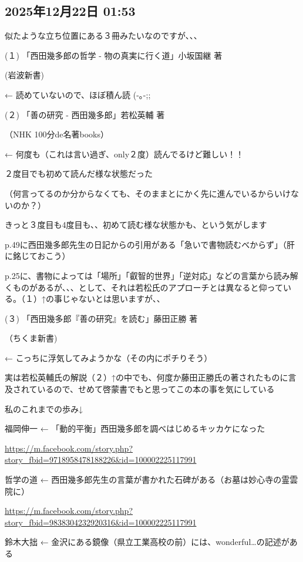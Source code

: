 \documentclass[facebook_diary.tex]{subfiles}
\begin{document}
\subsection*{2025年12月22日 01:53}

似たような立ち位置にある３冊みたいなのですが、、、


(１) 「西田幾多郎の哲学 - 物の真実に行く道」小坂国継 著

(岩波新書)

← 読めていないので、ほぼ積ん読 (-｡-;;


(２) 「善の研究 - 西田幾多郎」若松英輔 著

（NHK 100分de名著books）

← 何度も（これは言い過ぎ、only２度）読んでるけど難しい！！

２度目でも初めて読んだ様な状態だった

（何言ってるのか分からなくても、そのままとにかく先に進んでいるからいけないのか？）

きっと３度目も4度目も、、初めて読む様な状態かも、という気がします

p.49に西田幾多郎先生の日記からの引用がある「急いで書物読むべからず」（肝に銘じておこう）

p.25に、書物によっては「場所」「叡智的世界」「逆対応」などの言葉から読み解くものがあるが、、、として、それは若松氏のアプローチとは異なると仰っている。（１）↑の事じゃないとは思いますが、、


(３) 「西田幾多郎『善の研究』を読む」藤田正勝 著

（ちくま新書)

← こっちに浮気してみようかな（その内にポチりそう）

実は若松英輔氏の解説（２）↑の中でも、何度か藤田正勝氏の著されたものに言及されているので、せめて啓蒙書でもと思ってこの本の事を気にしている


私のこれまでの歩み↓


福岡伸一 ← 「動的平衡」西田幾多郎を調べはじめるキッカケになった

\url{https://m.facebook.com/story.php?story_fbid=9718958478188226&id=100002225117991}




哲学の道 ← 西田幾多郎先生の言葉が書かれた石碑がある（お墓は妙心寺の霊雲院に）

\url{https://m.facebook.com/story.php?story_fbid=9838304232920316&id=100002225117991}




鈴木大拙 ← 金沢にある鏡像（県立工業高校の前）には、wonderful…の記述がある
\end{document}
